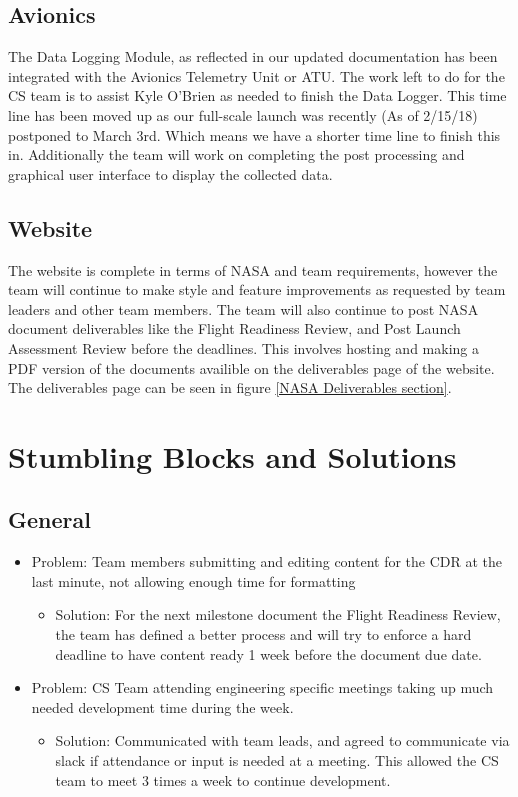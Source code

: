 \documentclass[onecolumn, draftclsnofoot,10pt, compsoc]{IEEEtran}
\begin{document}
\subsection{Avionics}
The Data Logging Module, as reflected in our updated documentation has been integrated with the Avionics Telemetry Unit or ATU. The work left to do for the CS team is to assist Kyle O'Brien as needed to finish the Data Logger. This time line has been moved up as our full-scale launch was recently (As of 2/15/18) postponed to March 3rd. Which means we have a shorter time line to finish this in. Additionally the team will work on completing the post processing and graphical user interface to display the collected data.  

\subsection{Website}
The website is complete in terms of NASA and team requirements, however the team will continue to make style and feature improvements as requested by team leaders and other team members. The team will also continue to post NASA document deliverables like the Flight Readiness Review, and Post Launch Assessment Review before the deadlines. This involves hosting and making a PDF version of the documents availible on the deliverables page of the website. The deliverables page can be seen in figure \ref{NASA Deliverables section}.


\section{Stumbling Blocks and Solutions}
\subsection{General}
\begin{itemize}
\item Problem: Team members submitting and editing content for the CDR at the last minute, not allowing enough time for formatting 
\begin{itemize}
\item Solution: For the next milestone document the Flight Readiness Review, the team has defined a better process and will try to enforce a hard deadline to have content ready 1 week before the document due date.
\end{itemize}
\item Problem: CS Team attending engineering specific meetings taking up much needed development time during the week.
\begin{itemize}
\item Solution: Communicated with team leads, and agreed to communicate via slack if attendance or input is needed at a meeting. This allowed the CS team to meet 3 times a week to continue development.
\end{itemize}
\end{itemize}
\end{document}
